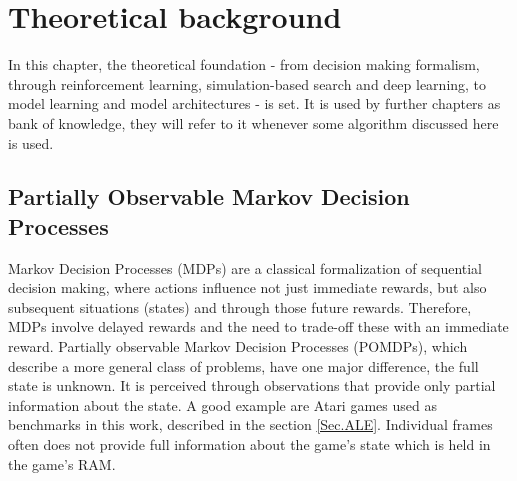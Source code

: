 \section{Theoretical background} \label{Sec.TheoreticalBackground}

In this chapter, the theoretical foundation - from decision making formalism, through reinforcement learning, simulation-based search and deep learning, to model learning and model architectures - is set. It is used by further chapters as bank of knowledge, they will refer to it whenever some algorithm discussed here is used.

\subsection{Partially Observable Markov Decision Processes} \label{Sec.POMDP}

Markov Decision Processes (MDPs) are a classical formalization of sequential decision making, where actions influence not just immediate rewards, but also subsequent situations (states) and through those future rewards. Therefore, MDPs involve delayed rewards and the need to trade-off these with an immediate reward.
Partially observable Markov Decision Processes (POMDPs), which describe a more general class of problems, have one major difference, the full state is unknown. It is perceived through observations that provide only partial information about the state. A good example are Atari games used as benchmarks in this work, described in the section \ref{Sec.ALE}. Individual frames often does not provide full information about the game's state which is held in the game's RAM.

